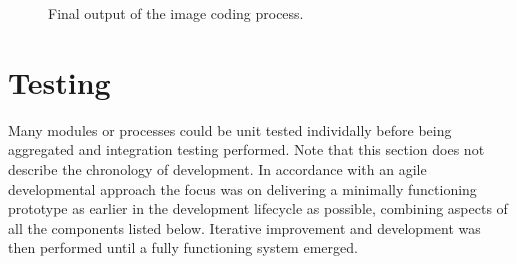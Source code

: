     
\begin{figure}[htp]
  \begin{center}
  \end{center}
  \caption{Final output of the image coding process.}
  \label{scn:images}
\end{figure}
    

\FloatBarrier
\section{Testing}

Many modules or processes could be unit tested individally before being aggregated and integration testing performed. Note that this section does not describe the chronology of development. In accordance with an agile developmental approach the focus was on delivering a minimally functioning prototype as earlier in the development lifecycle as possible, combining aspects of all the components listed below. Iterative improvement and development was then performed until a fully functioning system emerged.


